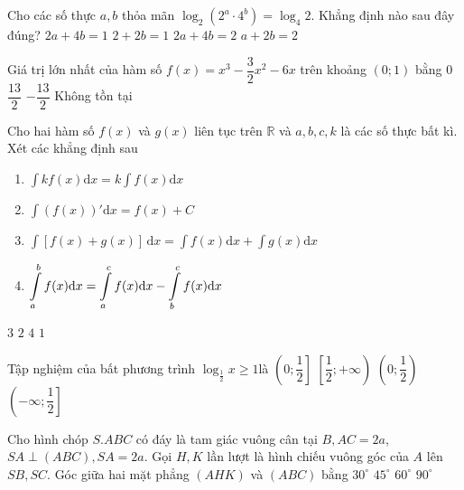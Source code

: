 \begin{ex}%
Cho các số thực $a, b$ thỏa mãn $\log_2\left(2^{a} \cdot 4^{b}\right)=\log_4 2$. Khẳng định nào sau đây đúng?
\choice
{\True $2 a+4 b=1$}
{$2+2 b=1$}
{$2 a+4 b=2$}
{$a+2 b=2$}

\end{ex}
\begin{ex}%
Giá trị lớn nhất của hàm số $f(x)=x^3-\dfrac{3}{2} x^2-6 x$ trên khoảng $(0; 1)$ bằng
\choice
{$0$}
{$\dfrac{13}{2}$}
{$-\dfrac{13}{2}$}
{\True Không tồn tại}

\end{ex}
\begin{ex}%
Cho hai hàm số $f(x)$ và $g(x)$ liên tục trên $\mathbb{R}$ và $a, b, c, k$ là các số thực bất kì. Xét các khẳng định sau
\begin{enumerate}
	

\item $\displaystyle\int k f(x) \mathrm{d} x=k \displaystyle\int f(x) \mathrm{d} x$\\
\item  $ \displaystyle\int(f(x))'\mathrm{d} x=f(x)+C $\\
\item  $ \displaystyle\int[f(x)+g(x)]\mathrm{\,d}x=\displaystyle\int f(x) \mathrm{d} x+ \displaystyle\int g(x) \mathrm{d} x$\\
\item $ \displaystyle\int\limits_a^{b} f(x) \mathrm{d} x=\displaystyle\int\limits_a^{c} f(x) \mathrm{d} x-\displaystyle\int\limits_b^{c} f(x){\rm d}x $
\end{enumerate}
\choice
{$3$}
{\True $2$}
{$4$}
{$1$}

\end{ex}
\begin{ex}%
Tập nghiệm của bất phương trình $ \log_{\frac{1}{2}} x \geq 1 $là
\choice
{\True $ \left(0; \dfrac{1}{2}\right] $}
{$ \left[\dfrac{1}{2};+\infty\right) $}
{$ \left(0; \dfrac{1}{2}\right) $}
{$ \left(-\infty; \dfrac{1}{2}\right] $}

\end{ex}
\begin{ex}%
Cho hình chóp $ S.ABC $ có đáy là tam giác vuông cân tại $ B, AC=2a $, $SA \perp(ABC), SA=2 a $. Gọi $ H, K $ lần lượt là hình chiếu vuông góc của $ A $ lên $ SB, SC $. Góc giữa hai mặt phẳng $ (AHK) $ và $ (ABC) $ bằng
\choice
{$ 30^{\circ} $}
{\True $ 45^{\circ} $}
{$ 60^{\circ} $}
{$ 90^{\circ} $}

\end{ex}
